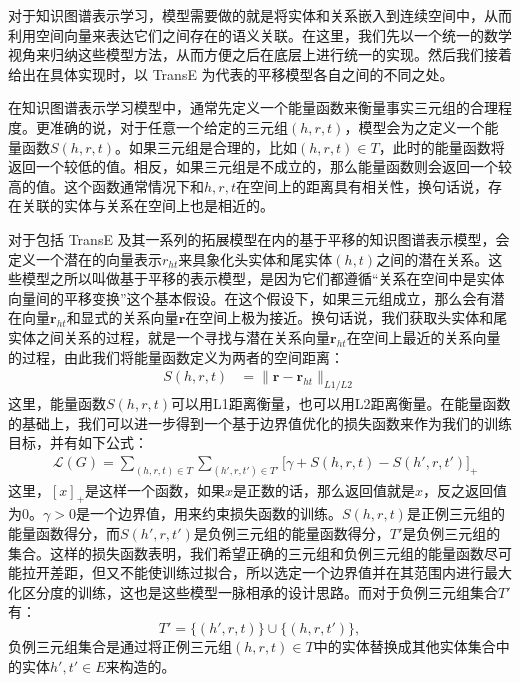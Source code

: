 对于知识图谱表示学习，模型需要做的就是将实体和关系嵌入到连续空间中，从而利用空间向量来表达它们之间存在的语义关联。在这里，我们先以一个统一的数学视角来归纳这些模型方法，从而方便之后在底层上进行统一的实现。然后我们接着给出在具体实现时，以 TransE 为代表的平移模型各自之间的不同之处。

在知识图谱表示学习模型中，通常先定义一个能量函数来衡量事实三元组的合理程度。更准确的说，对于任意一个给定的三元组$(h, r, t)$，模型会为之定义一个能量函数$S(h, r, t)$。如果三元组是合理的，比如$(h, r, t)\in T$，此时的能量函数将返回一个较低的值。相反，如果三元组是不成立的，那么能量函数则会返回一个较高的值。这个函数通常情况下和$h, r, t$在空间上的距离具有相关性，换句话说，存在关联的实体与关系在空间上也是相近的。

对于包括 TransE 及其一系列的拓展模型在内的基于平移的知识图谱表示模型，会定义一个潜在的向量表示$r_{ht}$来具象化头实体和尾实体$(h, t)$之间的潜在关系。这些模型之所以叫做基于平移的表示模型，是因为它们都遵循``关系在空间中是实体向量间的平移变换''这个基本假设。在这个假设下，如果三元组成立，那么会有潜在向量$\textbf{r}_{ht}$和显式的关系向量$\textbf{r}$在空间上极为接近。换句话说，我们获取头实体和尾实体之间关系的过程，就是一个寻找与潜在关系向量$\textbf{r}_{ht}$在空间上最近的关系向量的过程，由此我们将能量函数定义为两者的空间距离：
\begin{align}
\label{eq:energy functions}
S(h, r, t) & = \lVert \textbf{r} -  \textbf{r}_{ht} \rVert_{L1/L2}
\end{align}
这里，能量函数$S(h, r, t)$可以用L1距离衡量，也可以用L2距离衡量。在能量函数的基础上，我们可以进一步得到一个基于边界值优化的损失函数来作为我们的训练目标，并有如下公式：
\begin{align}
\label{eq:loss}
& \mathcal{L}(G) = \sum_{(h,r,t) \in T} \sum_{(h',r,t')\in T'} \big[ \gamma + S(h,r,t) - S(h', r, t') \big]_{+}
\end{align}
这里，$[x]_{+}$是这样一个函数，如果$x$是正数的话，那么返回值就是$x$，反之返回值为$0$。$\gamma > 0$是一个边界值，用来约束损失函数的训练。$S(h, r, t)$是正例三元组的能量函数得分，而$S(h', r, t')$是负例三元组的能量函数得分，$T'$是负例三元组的集合。这样的损失函数表明，我们希望正确的三元组和负例三元组的能量函数尽可能拉开差距，但又不能使训练过拟合，所以选定一个边界值并在其范围内进行最大化区分度的训练，这也是这些模型一脉相承的设计思路。而对于负例三元组集合$T'$有：
\begin{equation}
T' = \{(h',r,t)\}  \cup \{(h,r,t')\},
\end{equation}
负例三元组集合是通过将正例三元组$(h, r, t) \in T$中的实体替换成其他实体集合中的实体$h', t' \in E$来构造的。

